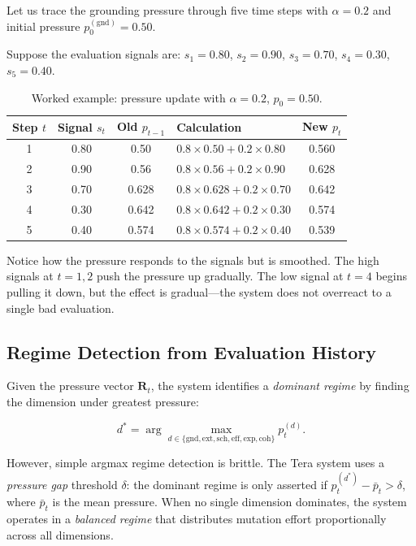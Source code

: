 Let us trace the grounding pressure through five time steps with $\alpha = 0.2$ and initial pressure $p_0^{(\text{gnd})} = 0.50$.

Suppose the evaluation signals are: $s_1 = 0.80$, $s_2 = 0.90$, $s_3 = 0.70$, $s_4 = 0.30$, $s_5 = 0.40$.

\begin{table}[H]
\centering
\caption{Worked example: pressure update with $\alpha = 0.2$, $p_0 = 0.50$.}
\label{tab:pressure-example}
\begin{tabularx}{\textwidth}{c c c Y c}
\toprule
\textbf{Step $t$} & \textbf{Signal $s_t$} & \textbf{Old $p_{t-1}$} & \textbf{Calculation} & \textbf{New $p_t$} \\
 & 0.80 & 0.50 & $0.8 \times 0.50 + 0.2 \times 0.80$ & 0.560 \\
2 & 0.90 & 0.56 & $0.8 \times 0.56 + 0.2 \times 0.90$ & 0.628 \\
3 & 0.70 & 0.628 & $0.8 \times 0.628 + 0.2 \times 0.70$ & 0.642 \\
4 & 0.30 & 0.642 & $0.8 \times 0.642 + 0.2 \times 0.30$ & 0.574 \\
5 & 0.40 & 0.574 & $0.8 \times 0.574 + 0.2 \times 0.40$ & 0.539 \\
\bottomrule
\end{tabularx}
\end{table}

Notice how the pressure responds to the signals but is smoothed. The high signals at $t=1,2$ push the pressure up gradually. The low signal at $t=4$ begins pulling it down, but the effect is gradual---the system does not overreact to a single bad evaluation.

\subsection{Regime Detection from Evaluation History}

Given the pressure vector $\mathbf{R}_t$, the system identifies a \emph{dominant regime} by finding the dimension under greatest pressure:

\begin{equation}
d^* = \arg\max_{d \in \{\text{gnd}, \text{ext}, \text{sch}, \text{eff}, \text{exp}, \text{coh}\}} p_t^{(d)}.
\label{eq:dominant-regime}
\end{equation}

However, simple argmax regime detection is brittle. The Tera system uses a \emph{pressure gap} threshold $\delta$: the dominant regime is only asserted if $p_t^{(d^*)} - \bar{p}_t > \delta$, where $\bar{p}_t$ is the mean pressure. When no single dimension dominates, the system operates in a \emph{balanced regime} that distributes mutation effort proportionally across all dimensions.

